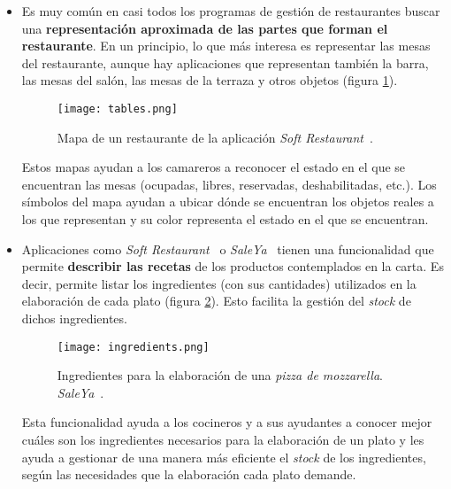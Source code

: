     \begin{itemize}
    \item Es muy común en casi todos los programas de gestión de restaurantes
    buscar una \textbf{representación aproximada de las partes que forman el
    restaurante}. En un principio, lo que más interesa es representar las 
    mesas del restaurante, aunque hay aplicaciones que representan también
    la barra, las mesas del salón, las mesas de la terraza y otros objetos
    (figura \ref{fig:tables}).

    \begin{figure}[!h]
      \begin{center}
        \texttt{[image: tables.png]}
        \caption{Mapa de un restaurante de la aplicación
        \emph{Soft Restaurant}~\cite{bib:softRestaurant}.}
        \label{fig:tables}
      \end{center}
    \end{figure}

    Estos mapas ayudan a los camareros a reconocer el estado en el que se
    encuentran las mesas (ocupadas, libres, reservadas, deshabilitadas, etc.).
    Los símbolos del mapa ayudan a ubicar dónde se encuentran los objetos
    reales a los que representan y su color representa el estado en el que
    se encuentran.

    \item Aplicaciones como \emph{Soft Restaurant}~\cite{bib:softRestaurant} o 
    \emph{SaleYa}~\cite{bib:saleYa} tienen una funcionalidad que permite 
    \textbf{describir las recetas} de los productos contemplados en la carta. 
    Es decir, permite listar los ingredientes (con sus cantidades) utilizados 
    en la elaboración de cada plato (figura \ref{fig:ingredients}). Esto 
    facilita la gestión del \emph{stock} de dichos ingredientes.

    \begin{figure}[!h]
      \begin{center}
        \texttt{[image: ingredients.png]}
        \caption{Ingredientes para la elaboración de una \emph{pizza de 
        mozzarella}. \emph{SaleYa}~\cite{bib:saleYa}.}
        \label{fig:ingredients}
      \end{center}
    \end{figure}

    Esta funcionalidad ayuda a los cocineros y a sus ayudantes a conocer
    mejor cuáles son los ingredientes necesarios para la elaboración de 
    un plato y les ayuda a gestionar de una manera más eficiente el
    \emph{stock} de los ingredientes, según las necesidades que la 
    elaboración cada plato demande.


\end{itemize}
